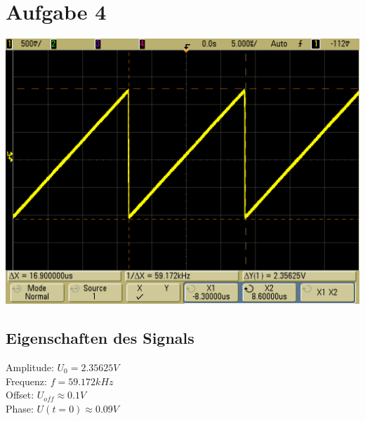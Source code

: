 \documentclass[compress,11pt]{beamer}
\begin{document}
\section{Aufgabe 4}
\begin{frame}
\includegraphics[width=\textwidth]{images/scope_13}
\end{frame}
\begin{frame}
\subsection{Eigenschaften des Signals}
Amplitude: $U_0 = 2.35625 V$ \\
Frequenz: $f = 59.172 kHz$ \\
Offset: $U_{off} \approx 0.1 V$ \\
Phase: $U(t=0) \approx 0.09 V$\
\end{frame}
\end{document}
